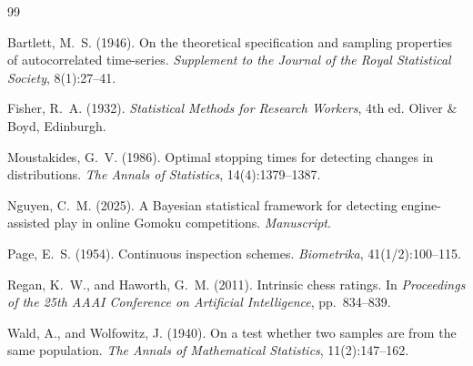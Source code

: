 \documentclass[11pt,a4paper]{article}
\begin{document}

\begin{thebibliography}{99}

Bartlett, M.~S. (1946).
On the theoretical specification and sampling properties of autocorrelated
time-series.
\textit{Supplement to the Journal of the Royal Statistical Society},
8(1):27--41.

Fisher, R.~A. (1932).
\textit{Statistical Methods for Research Workers}, 4th ed.
Oliver \& Boyd, Edinburgh.

Moustakides, G.~V. (1986).
Optimal stopping times for detecting changes in distributions.
\textit{The Annals of Statistics}, 14(4):1379--1387.

Nguyen, C.~M. (2025).
A Bayesian statistical framework for detecting engine-assisted play in
online Gomoku competitions.
\textit{Manuscript}.

Page, E.~S. (1954).
Continuous inspection schemes.
\textit{Biometrika}, 41(1/2):100--115.

Regan, K.~W., and Haworth, G.~M. (2011).
Intrinsic chess ratings.
In \textit{Proceedings of the 25th AAAI Conference on Artificial
Intelligence}, pp.~834--839.

Wald, A., and Wolfowitz, J. (1940).
On a test whether two samples are from the same population.
\textit{The Annals of Mathematical Statistics}, 11(2):147--162.

\end{thebibliography}
\end{document}
